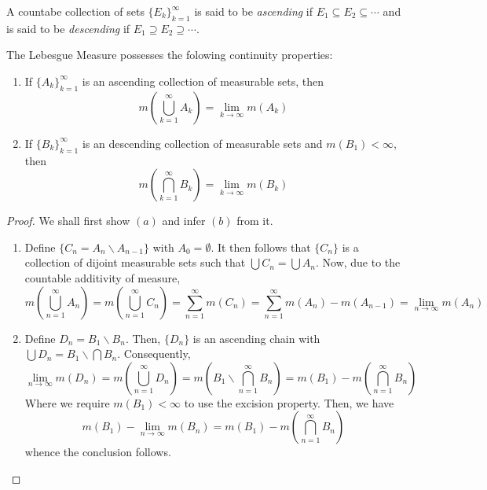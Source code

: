 \begin{definition}
    A countabe collection of sets $\{E_k\}_{k = 1}^\infty$ is said to be \textit{ascending} if $E_1\subseteq E_2\subseteq\cdots$ and is said to be \textit{descending} if $E_1\supseteq E_2\supseteq\cdots$.
\end{definition}

\begin{theorem}
    The Lebesgue Measure possesses the folowing continuity properties: 
    \begin{enumerate}[label=(\alph*)]
        \item If $\{A_k\}_{k = 1}^\infty$ is an ascending collection of measurable sets, then 
        \begin{equation*}
            m\left(\bigcup_{k = 1}^\infty A_k\right) = \lim_{k\to\infty} m(A_k)
        \end{equation*}
        \item If $\{B_k\}_{k = 1}^\infty$ is an descending collection of measurable sets and $m(B_1) < \infty$, then
        \begin{equation*}
            m\left(\bigcap_{k = 1}^\infty B_k\right) = \lim_{k\to\infty} m(B_k)
        \end{equation*}
    \end{enumerate}
\end{theorem}
\begin{proof}
We shall first show $(a)$ and infer $(b)$ from it.
\begin{enumerate}[label=(\alph*)]
    \item Define $\{C_n = A_n\backslash A_{n - 1} \}$ with $A_0 = \emptyset$. It then follows that $\{C_n\}$ is a collection of dijoint measurable sets such that $\bigcup C_n = \bigcup A_n$. Now, due to the countable additivity of measure, 
    \begin{equation*}
        m\left(\bigcup_{n = 1}^\infty A_n\right) = m\left(\bigcup_{n = 1}^\infty C_n\right) = \sum_{n = 1}^\infty m(C_n) = \sum_{n = 1}^\infty m(A_n) - m(A_{n - 1}) = \lim_{n\to\infty} m(A_n)
    \end{equation*}
    \item Define $D_n = B_1\backslash B_n$. Then, $\{D_n\}$ is an ascending chain with $\bigcup D_n = B_1\backslash\bigcap B_n$. Consequently, 
    \begin{equation*}
        \lim_{n\to\infty} m(D_n) = m\left(\bigcup_{n = 1}^\infty D_n\right) = m\left(B_1\backslash\bigcap_{n = 1}^\infty B_n\right) = m(B_1) - m\left(\bigcap_{n = 1}^\infty B_n\right)
    \end{equation*}
    Where we require $m(B_1) < \infty$ to use the excision property. Then, we have 
    \begin{equation*}
        m(B_1) - \lim_{n\to\infty} m(B_n) = m(B_1) - m\left(\bigcap_{n = 1}^\infty B_n\right)
    \end{equation*}
    whence the conclusion follows.
\end{enumerate}
\end{proof}

